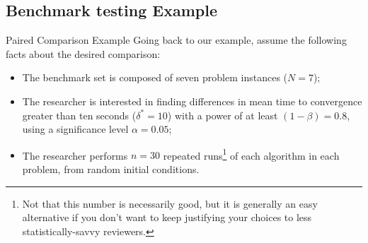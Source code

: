 \subsection{Benchmark testing Example}

\begin{frame}{Paired Comparison Example}
Going back to our example, assume the following facts about the desired comparison:\bigskip

\begin{itemize}
\item The benchmark set is composed of seven problem instances ($N=7$);
\item The researcher is interested in finding differences in mean time to convergence greater than ten seconds ($\delta^*=10$) with a power of at least $(1-\beta)=0.8$, using a significance level $\alpha=0.05$;
\item The researcher performs $n=30$ repeated runs\footnote[1]{\tiny Not that this number is necessarily good, but it is generally an easy alternative if you don't want to keep justifying your choices to less statistically-savvy reviewers.} of each algorithm in each problem, from random initial conditions.
\end{itemize}
\end{frame}



